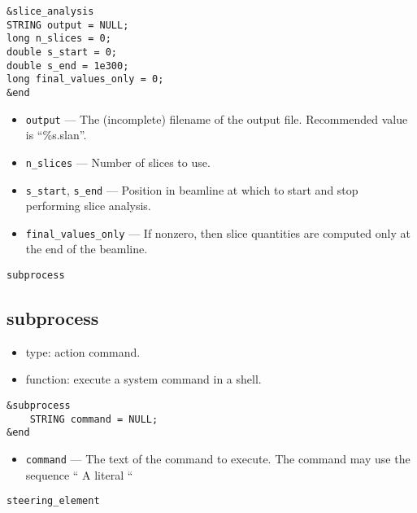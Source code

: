 \documentclass[11pt]{article}
\begin{document}
\begin{verbatim}
&slice_analysis
STRING output = NULL;
long n_slices = 0;
double s_start = 0;
double s_end = 1e300;
long final_values_only = 0;
&end
\end{verbatim}

\begin{itemize}
\item \verb|output| --- The (incomplete) filename of the output file.
	Recommended value is ``\%s.slan''.
\item \verb|n_slices| --- Number of slices to use.
\item \verb|s_start|, \verb|s_end| --- Position in beamline at which to start
        and stop performing slice analysis.
\item \verb|final_values_only| --- If nonzero, then slice quantities are computed
        only at the end of the beamline.
\end{itemize}

\begin{latexonly}
\newpage
\begin{center}{\Large\verb|subprocess|}\end{center}
\end{latexonly}
\subsection{subprocess \label{subsec:subprocess}}

\begin{itemize}
\item type: action command.
\item function: execute a system command in a shell.
\end{itemize}

\begin{verbatim}
&subprocess 
    STRING command = NULL;
&end
\end{verbatim}

\begin{itemize}
\item \verb|command| --- The text of the command to execute.  The command may
use the sequence ``%
A literal ``%
\end{itemize}

\begin{latexonly}
\newpage
\begin{center}{\Large\verb|steering_element|}\end{center}
\end{latexonly}
\end{document}

